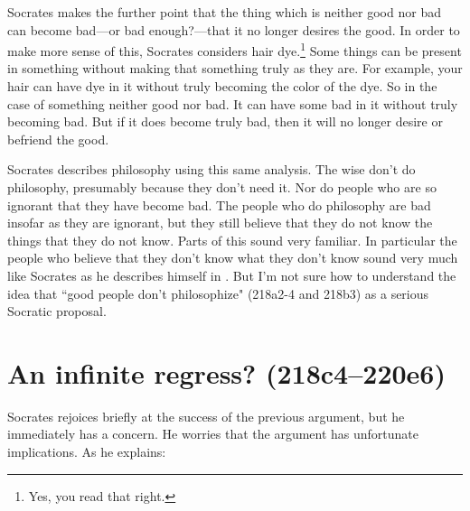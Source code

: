 \documentclass[11pt]{article}
\begin{document}
Socrates makes the further point that the thing which is neither good nor bad can become bad---or bad enough?---that it no longer desires the good.  In order to make more sense of this, Socrates considers hair dye.\footnote{Yes, you read that right.}  Some things can be present in something without making that something truly as they are.  For example, your hair can have dye in it without truly becoming the color of the dye.  So in the case of something neither good nor bad.  It can have some bad in it without truly becoming bad.  But if it does become truly bad, then it will no longer desire or befriend the good.

Socrates describes philosophy using this same analysis.  The wise don't do philosophy, presumably because they don't need it.  Nor do people who are so ignorant that they have become bad.  The people who do philosophy are bad insofar as they are ignorant, but they still believe that they do not know the things that they do not know.  Parts of this sound very familiar.  In particular the people who believe that they don't know what they don't know sound very much like Socrates as he describes himself in .  But I'm not sure how to understand the idea that ``good people don't philosophize" (218a2-4 and 218b3) as a serious Socratic proposal.


\section{An infinite regress? (218c4--220e6)}

Socrates rejoices briefly at the success of the previous argument, but he immediately has a concern.  He worries that the argument has unfortunate implications.  As he explains:
\end{document}
